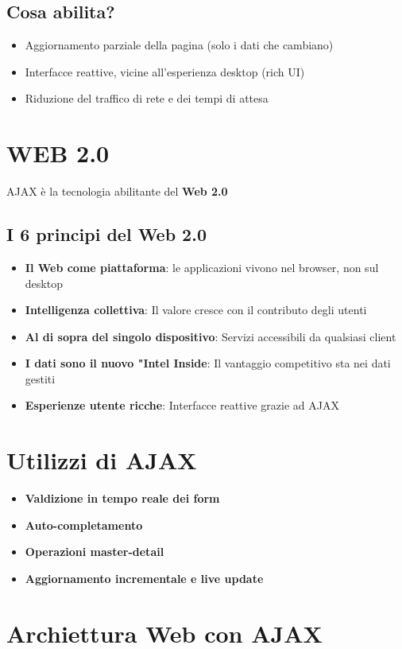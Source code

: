\subsection{Cosa abilita?}
\begin{itemize}
    \item Aggiornamento parziale della pagina (solo i dati che cambiano)
    \item Interfacce reattive, vicine all'esperienza desktop (rich UI)
    \item Riduzione del traffico di rete e dei tempi di attesa
\end{itemize}
\section{WEB 2.0}
AJAX è la tecnologia abilitante del \textbf{Web 2.0}
\subsection{I 6 principi del Web 2.0}
\begin{itemize}
    \item \textbf{Il Web come piattaforma}: le applicazioni vivono nel browser, non sul desktop
    \item \textbf{Intelligenza collettiva}: Il valore cresce con il contributo degli utenti
    \item \textbf{Al di sopra del singolo dispositivo}: Servizi accessibili da qualsiasi client
    \item \textbf{I dati sono il nuovo "Intel Inside}: Il vantaggio competitivo sta nei dati gestiti
    \item \textbf{Esperienze utente ricche}: Interfacce reattive grazie ad AJAX
\end{itemize}
\section{Utilizzi di AJAX}
\begin{itemize}
    \item \textbf{Valdizione in tempo reale dei form}
    \item \textbf{Auto-completamento}
    \item \textbf{Operazioni master-detail}
    \item \textbf{Aggiornamento incrementale e live update}
\end{itemize}

\newpage
\section{Archiettura Web con AJAX}
